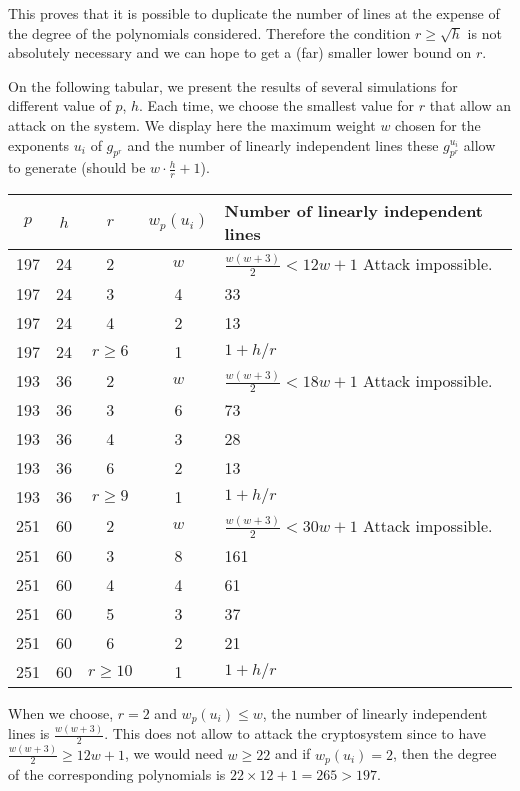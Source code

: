 \documentclass[12pt,a4paper,titlepage]{article}
\begin{document}
This proves that it is possible to duplicate the number of lines at the expense of the degree of the polynomials considered. Therefore the condition $r \geq \sqrt{h}$ is not absolutely necessary and we can hope to get a (far) smaller lower bound on $r$.

On the following tabular, we present the results of several simulations for different value of $p$, $h$. Each time, we choose the smallest value for $r$ that allow an attack on the system. We display here the maximum weight $w$ chosen for the exponents $u_i$ of $g_{p^r}$ and the number of linearly independent lines these $g_{p^r}^{u_i}$ allow to generate (should be $w\cdot \frac{h}{r} +1$).


\begin{tabular}{|c|c|c|c|l|}
\hline
$p$ & $h$ & $r$ & $w_p(u_i)$ & Number of linearly independent lines  \\
\hline
197 & 24 & 2 & $w$ & $\frac{w(w+3)}{2} < 12w+1$ Attack impossible. \\
\hline
197 & 24 & 3 & 4 & 33\\
\hline
197 & 24 & 4 & 2 & 13\\
\hline
197 & 24 & $r \geq 6$ & 1 & $1 + h/r$ \\
\hline
193 & 36 & 2 & $w$ & $\frac{w(w+3)}{2} < 18w+1$ Attack impossible. \\
\hline
193 & 36 & 3 & 6 & 73\\
\hline
193 & 36 & 4 & 3 & 28\\
\hline
193 & 36 & 6 & 2 & 13\\
\hline
193 & 36 & $r \geq 9$ & 1 & $1 + h/r$ \\
\hline
251 & 60 & 2 & $w$ & $\frac{w(w+3)}{2} < 30w+1$ Attack impossible. \\
\hline
251 & 60 & 3 & 8 & 161\\
\hline
251 & 60 & 4 & 4 & 61\\
\hline
251 & 60 & 5 & 3 & 37\\
\hline
251 & 60 & 6 & 2 & 21\\
\hline
251 & 60 & $r \geq 10$ & 1 & $1 + h/r$ \\
\hline
\end{tabular}

When we choose, $r = 2$ and $w_p(u_i) \leq w$, the number of linearly independent lines is $\frac{w(w+3)}{2}$. This does not allow to attack the cryptosystem since to have $\frac{w(w+3)}{2} \geq 12w+1$, we would need $w \geq 22$ and if $w_p(u_i) = 2$, then the degree of the corresponding polynomials is $22 \times 12+1 = 265 > 197$.
\end{document}
